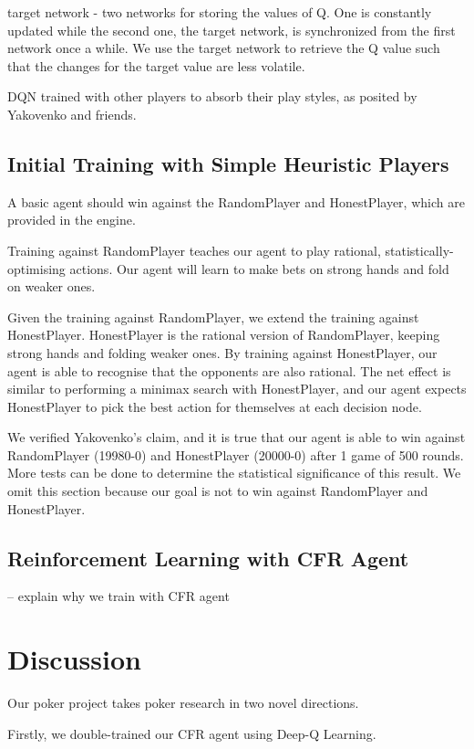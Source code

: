 \documentclass{article}
\begin{document}
target network
- two networks for storing the values of Q. One is constantly updated while the second one, the target network, is synchronized from the first network once a while. We use the target network to retrieve the Q value such that the changes for the target value are less volatile. 

DQN trained with other players to absorb their play styles, as posited by Yakovenko and friends.

\subsection{Initial Training with Simple Heuristic Players}
A basic agent should win against the RandomPlayer and HonestPlayer, which are provided in the engine.

Training against RandomPlayer teaches our agent to play rational, statistically-optimising actions. Our agent will learn to make bets on strong hands and fold on weaker ones. 

Given the training against RandomPlayer, we extend the training against HonestPlayer. HonestPlayer is the rational version of RandomPlayer, keeping strong hands and folding weaker ones. By training against HonestPlayer, our agent is able to recognise that the opponents are also rational. The net effect is similar to performing a minimax search with HonestPlayer, and our agent expects HonestPlayer to pick the best action for themselves at each decision node.

We verified Yakovenko's claim, and it is true that our agent is able to win against RandomPlayer (19980-0) and HonestPlayer (20000-0) after 1 game of 500 rounds. More tests can be done to determine the statistical significance of this result. We omit this section because our goal is not to win against RandomPlayer and HonestPlayer.

\subsection{Reinforcement Learning with CFR Agent}

-- explain why we train with CFR agent

\section{Discussion}
Our poker project takes poker research in two novel directions.

Firstly, we double-trained our CFR agent using Deep-Q Learning.
\end{document}
